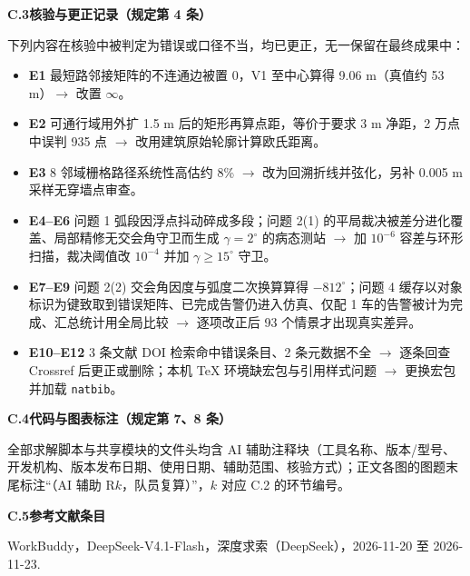 \documentclass[UTF8,a4paper,zihao=-4,oneside]{ctexart}
\begin{document}
{\vspace{3pt}
\noindent\textbf{C.3\quad 核验与更正记录（规定第 4 条）}

下列内容在核验中被判定为错误或口径不当，均已更正，无一保留在最终成果中：
\begin{itemize}[leftmargin=1.6em]
  \item \textbf{E1} 最短路邻接矩阵的不连通边被置 0，V1 至中心算得 9.06 m（真值约 53 m）$\rightarrow$ 改置 $\infty$。
  \item \textbf{E2} 可通行域用外扩 1.5 m 后的矩形再算点距，等价于要求 3 m 净距，2 万点中误判 935 点 $\rightarrow$ 改用建筑原始轮廓计算欧氏距离。
  \item \textbf{E3} 8 邻域栅格路径系统性高估约 8\% $\rightarrow$ 改为回溯折线并弦化，另补 0.005 m 采样无穿墙点审查。
  \item \textbf{E4--E6} 问题 1 弧段因浮点抖动碎成多段；问题 2(1) 的平局裁决被差分进化覆盖、局部精修无交会角守卫而生成 $\gamma=2^\circ$ 的病态测站 $\rightarrow$ 加 $10^{-6}$ 容差与环形扫描，裁决阈值改 $10^{-4}$ 并加 $\gamma\ge15^\circ$ 守卫。
  \item \textbf{E7--E9} 问题 2(2) 交会角因度与弧度二次换算算得 $-812^\circ$；问题 4 缓存以对象标识为键致取到错误矩阵、已完成告警仍进入仿真、仅配 1 车的告警被计为完成、汇总统计用全局比较 $\rightarrow$ 逐项改正后 93 个情景才出现真实差异。
  \item \textbf{E10--E12} 3 条文献 DOI 检索命中错误条目、2 条元数据不全 $\rightarrow$ 逐条回查 Crossref 后更正或删除；本机 \TeX{} 环境缺宏包与引用样式问题 $\rightarrow$ 更换宏包并加载 \texttt{natbib}。
\end{itemize}

\vspace{3pt}
\noindent\textbf{C.4\quad 代码与图表标注（规定第 7、8 条）}

全部求解脚本与共享模块的文件头均含 AI 辅助注释块（工具名称、版本/型号、开发机构、版本发布日期、使用日期、辅助范围、核验方式）；正文各图的图题末尾标注“（AI 辅助 R$k$，队员复算）”，$k$ 对应 C.2 的环节编号。

\vspace{3pt}
\noindent\textbf{C.5\quad 参考文献条目}

\noindent [13] WorkBuddy，DeepSeek-V4.1-Flash，深度求索（DeepSeek），2026-11-20 至 2026-11-23.
\par}
\end{document}

